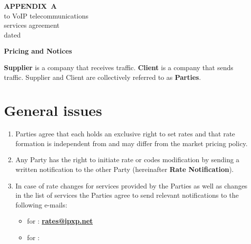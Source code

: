 

\begin{Form}
\appendix
{}


  \begin{raggedleft}
    \hfill\parbox{5.8cm}{
    \textbf{APPENDIX~A}\\
    to  VoIP telecommunications\\
    services agreement\\
    dated \underline{\TextField[name=contractdate,charsize=10pt,width=5em,height=1em,borderwidth=0,
    bordercolor={1 1 1},align=0]{}}~\textnumero~\underline{\TextField[name=contractnum,charsize=10pt,width=6em,
    height=1em,borderwidth=0,bordercolor={1 1 1},align=0]{}}
    }
  \end{raggedleft}

  \baselineskip

  \begin{center}
   \textbf{\Large{Pricing and Notices}}\label{anx:a-en}
  \end{center}

  \textbf{Supplier }is a company that receives traffic. \textbf{Client
  }is a company that sends traffic. Supplier and Client are collectively
  referred to as \textbf{Parties}.   

  \section{General issues}

   \begin{enumerate}[label=\thesection.\arabic*.]
    \item Parties agree that each holds an exclusive right to set rates and
      that rate formation is independent from and may differ from the market
      pricing policy.
    \item Any Party has the right to initiate rate or codes modification by
      sending a written notification to the other Party (hereinafter \flqq{}\textbf{Rate
      Notification}\frqq{}). 
    \item In case of rate changes for services provided by the Parties as well
      as changes in the list of services the Parties agree to send relevant
      notifications to the following e-mails:
      
      \begin{itemize}
      \item for \textbf{\ipxpname}: \href{mailto:rates@ipxp.net}{\textbf{rates@ipxp.net}}
      \item for \underline{\TextField[name=clntname,charsize=10pt,width=19em,height=1em,borderwidth=0,bordercolor={1 1 1}]{}}:
              \underline{\TextField[name=clntratesemail,charsize=10pt,width=76mm,height=1em,borderwidth=0,
              bordercolor={1 1 1}]{}}
              \\[\medskipamount]
              \underline{\TextField[name=clntratesemailnext,charsize=10pt,width=151mm,height=1em,borderwidth=0,
              bordercolor={1 1 1}]{}}                          
      \end{itemize}


\end{enumerate}
\end{Form}
